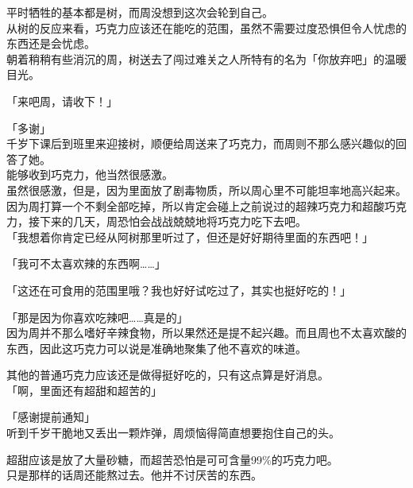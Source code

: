 平时牺牲的基本都是树，而周没想到这次会轮到自己。\\

从树的反应来看，巧克力应该还在能吃的范围，虽然不需要过度恐惧但令人忧虑的东西还是会忧虑。\\

朝着稍稍有些消沉的周，树送去了闯过难关之人所特有的名为「你放弃吧」的温暖目光。\\

\vspace{2\baselineskip}

「来吧周，请收下！」

「多谢」\\

千岁下课后到班里来迎接树，顺便给周送来了巧克力，而周则不那么感兴趣似的回答了她。\\

能够收到巧克力，他当然很感激。\\

虽然很感激，但是，因为里面放了剧毒物质，所以周心里不可能坦率地高兴起来。\\

因为周打算一个不剩全部吃掉，所以肯定会碰上之前说过的超辣巧克力和超酸巧克力，接下来的几天，周恐怕会战战兢兢地将巧克力吃下去吧。\\

「我想着你肯定已经从阿树那里听过了，但还是好好期待里面的东西吧！」

「我可不太喜欢辣的东西啊……」

「这还在可食用的范围里哦？我也好好试吃过了，其实也挺好吃的！」

「那是因为你喜欢吃辣吧……真是的」\\

因为周并不那么嗜好辛辣食物，所以果然还是提不起兴趣。而且周也不太喜欢酸的东西，因此这巧克力可以说是准确地聚集了他不喜欢的味道。

其他的普通巧克力应该还是做得挺好吃的，只有这点算是好消息。\\

「啊，里面还有超甜和超苦的」

「感谢提前通知」\\

听到千岁干脆地又丢出一颗炸弹，周烦恼得简直想要抱住自己的头。

超甜应该是放了大量砂糖，而超苦恐怕是可可含量99\%的巧克力吧。\\

只是那样的话周还能熬过去。他并不讨厌苦的东西。\\

